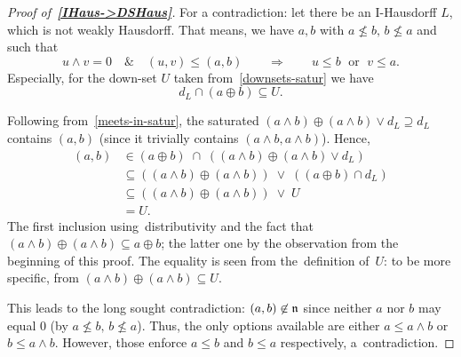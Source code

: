 \begin{proof}[Proof of~{\bf \ref{IHaus->DSHaus}}\thinspace]
  For a contradiction: let there be an I-Hausdorff $L$, which is not weakly
  Hausdorff.
  That means, we have $a, b$ with $a \not\leq b, \, b \not\leq a$ and such that
  \[
    u \wedge v = 0 \quad \& \quad \left(u, v\right) \leq \left(a, b\right)
    \qquad \Longrightarrow \qquad
    u \leq b \; \textrm{ or } \; v \leq a.
  \]
  Especially, for the down-set $U$ taken from~\ref{downsets-satur} we have
  \[
    d_L \cap (a \oplus b) \subseteq U.
  \]

  Following from~\ref{meets-in-satur}\thinspace, the saturated $\left(a \wedge
  b\right) \oplus \left(a \wedge b\right) \vee d_L \supseteq d_L$ contains $(a,
  b)$ (since it trivially contains $\left( a \wedge b, a \wedge b \right)$).
  Hence,
  \begin{align*}
    (a, b) &\in (a \oplus b) \; \cap \; ((a \wedge b) \oplus (a \wedge b) \vee d_L) \\
           &\subseteq ((a \wedge b) \oplus (a \wedge b)) \; \vee \; ((a \oplus b) \cap d_L) \\
           &\subseteq ((a \wedge b) \oplus (a \wedge b)) \; \vee \; U \\
           &= U.
  \end{align*}
  The first inclusion using~distributivity and the fact that $(a \wedge b)
  \oplus (a \wedge b) \subseteq a \oplus b$;
  the latter one by the observation from the beginning of this proof.
  The equality is seen from the~definition of~$U$:
  to be more specific, from $(a \wedge b) \oplus (a \wedge b) \subseteq U$.

  This leads to the long sought contradiction:
  $(a, b)\not\in \mathfrak{n}$ since neither $a$ nor $b$ may equal $0$ (by $a \not\leq b,
  \, b \not\leq a$).
  Thus, the only options available are either $a \leq a \wedge b$ or $b \leq a
  \wedge b$.
  However, those enforce $a \leq b$ and $b \leq a$ respectively,
  a~contradiction. 
\end{proof}
